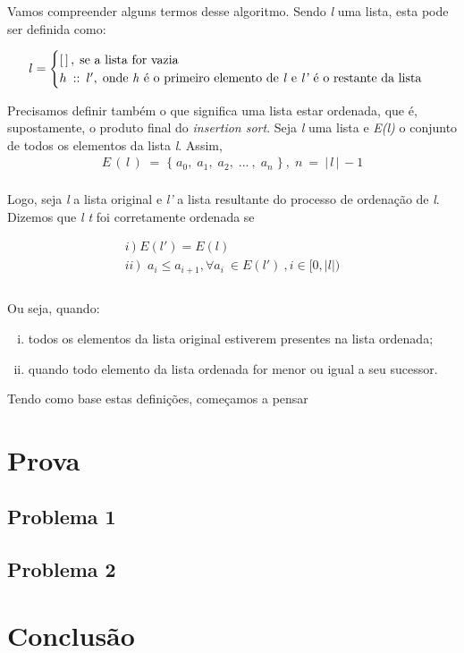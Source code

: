 \documentclass[a4paper, 10pt]{article}
\begin{document}
Vamos compreender alguns termos desse algoritmo. Sendo \textit{l} uma lista, esta pode ser definida como:

	\begin{equation*}
		l =
        \begin{cases}
        	[\,]\,,\; \text{se a lista for vazia}\\
            h\: :: \: l',\; \text{onde \textit{h} é o primeiro elemento de \textit{l} e \textit{l'} é o restante da lista} \\
        \end{cases}
	\end{equation*}

Precisamos definir também o que significa uma lista estar ordenada, que é, supostamente, o produto final do \textit{insertion sort}. Seja \textit{l}
uma lista e \textit{E(l)} o conjunto de todos os elementos da lista \textit{l}. Assim,
\begin{align*}
	E\,(\,l\,)\;=\; \{\;a_0,\;a_1,\;a_2,\;...\:,\;a_n\;\}\:,\;n\:=\:|\,l\,|\,-1
\end{align*}
\\
Logo, seja \textit{l} a lista original e \textit{l'} a lista resultante do processo de ordenação de \textit{l}. Dizemos que \textit{l t} foi corretamente ordenada se

\begin{gather*}
   i\,)\;E(l')=E(l) \\
   ii\,)\;\; a_i \leq a_{i+1}, \forall a_i \: \in E(l') \: , i\in [0,|l|) \\ 
\end{gather*}  
\\
Ou seja, quando:
\begin{enumerate}[i)]
	\item todos os elementos da lista original estiverem presentes na lista ordenada;
    \item quando todo elemento da lista ordenada for menor ou igual a seu sucessor.
\end{enumerate}

Tendo como base estas definições, começamos a pensar

\section{Prova}

\subsection{Problema 1}

\subsection{Problema 2}

\section{Conclusão}
\end{document}
